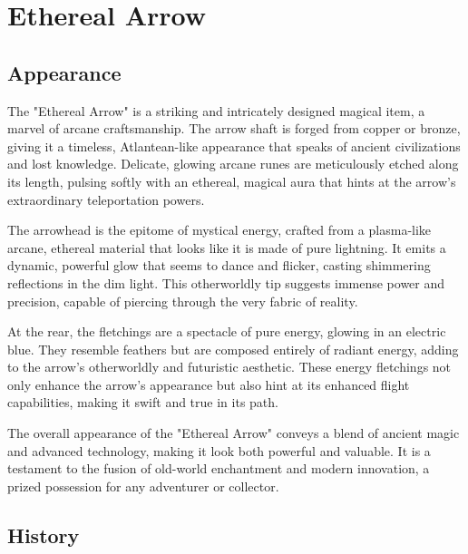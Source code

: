 
\chapter*{Ethereal Arrow}

\section*{Appearance}

The "Ethereal Arrow" is a striking and intricately designed magical item, a marvel of arcane craftsmanship. The arrow shaft is forged from copper or bronze, giving it a timeless, Atlantean-like appearance that speaks of ancient civilizations and lost knowledge. Delicate, glowing arcane runes are meticulously etched along its length, pulsing softly with an ethereal, magical aura that hints at the arrow's extraordinary teleportation powers.

The arrowhead is the epitome of mystical energy, crafted from a plasma-like arcane, ethereal material that looks like it is made of pure lightning. It emits a dynamic, powerful glow that seems to dance and flicker, casting shimmering reflections in the dim light. This otherworldly tip suggests immense power and precision, capable of piercing through the very fabric of reality.

At the rear, the fletchings are a spectacle of pure energy, glowing in an electric blue. They resemble feathers but are composed entirely of radiant energy, adding to the arrow's otherworldly and futuristic aesthetic. These energy fletchings not only enhance the arrow's appearance but also hint at its enhanced flight capabilities, making it swift and true in its path.

The overall appearance of the "Ethereal Arrow" conveys a blend of ancient magic and advanced technology, making it look both powerful and valuable. It is a testament to the fusion of old-world enchantment and modern innovation, a prized possession for any adventurer or collector.

\section*{History}

